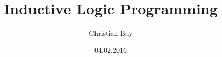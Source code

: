 \documentclass[12pt]{beamer}
\title[Machine Learning -- ILP]{Inductive Logic Programming} %
\author{Christian Bay} %
\institute[FAU] %
{
	FAU Erlangen-Nürnberg \\ %
	\medskip
	\textit{christian.bay@fau.de} %
}
\date{04.02.2016} %
\begin{document}
\begin{frame}
	\titlepage
\end{frame}
\tableofcontents






%
%
%
%
\end{document}
